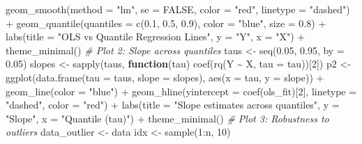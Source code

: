 \documentclass[fleqn,8pt]{latex/stylish_article} %
\newenvironment{Shaded}{\begin{snugshade}}{\end{snugshade}}
\newcommand{\DecValTok}[1]{\textcolor[rgb]{0.00,0.00,0.81}{{#1}}}
\newcommand{\FloatTok}[1]{\textcolor[rgb]{0.00,0.00,0.81}{{#1}}}
\newcommand{\ConstantTok}[1]{\textcolor[rgb]{0.00,0.00,0.00}{{#1}}}
\newcommand{\SpecialCharTok}[1]{\textcolor[rgb]{0.00,0.00,0.00}{{#1}}}
\newcommand{\StringTok}[1]{\textcolor[rgb]{0.31,0.60,0.02}{{#1}}}
\newcommand{\CommentTok}[1]{\textcolor[rgb]{0.56,0.35,0.01}{\textit{{#1}}}}
\newcommand{\OtherTok}[1]{\textcolor[rgb]{0.56,0.35,0.01}{{#1}}}
\newcommand{\FunctionTok}[1]{\textcolor[rgb]{0.00,0.00,0.00}{{#1}}}
\newcommand{\ControlFlowTok}[1]{\textcolor[rgb]{0.13,0.29,0.53}{\textbf{{#1}}}}
\newcommand{\AttributeTok}[1]{\textcolor[rgb]{0.77,0.63,0.00}{{#1}}}
\newcommand{\NormalTok}[1]{{#1}}
\begin{document}
\begin{Shaded}
\begin{Highlighting}[]
    \FunctionTok{geom\_smooth}\NormalTok{(}\AttributeTok{method =} \StringTok{"lm"}\NormalTok{, }\AttributeTok{se =} \ConstantTok{FALSE}\NormalTok{, }\AttributeTok{color =} \StringTok{"red"}\NormalTok{,}
        \AttributeTok{linetype =} \StringTok{"dashed"}\NormalTok{) }\SpecialCharTok{+} \FunctionTok{geom\_quantile}\NormalTok{(}\AttributeTok{quantiles =} \FunctionTok{c}\NormalTok{(}\FloatTok{0.1}\NormalTok{,}
    \FloatTok{0.5}\NormalTok{, }\FloatTok{0.9}\NormalTok{), }\AttributeTok{color =} \StringTok{"blue"}\NormalTok{, }\AttributeTok{size =} \FloatTok{0.8}\NormalTok{) }\SpecialCharTok{+} \FunctionTok{labs}\NormalTok{(}\AttributeTok{title =} \StringTok{"OLS vs Quantile Regression Lines"}\NormalTok{,}
    \AttributeTok{y =} \StringTok{"Y"}\NormalTok{, }\AttributeTok{x =} \StringTok{"X"}\NormalTok{) }\SpecialCharTok{+} \FunctionTok{theme\_minimal}\NormalTok{()}
\CommentTok{\# Plot 2: Slope across quantiles}
\NormalTok{taus }\OtherTok{\textless{}{-}} \FunctionTok{seq}\NormalTok{(}\FloatTok{0.05}\NormalTok{, }\FloatTok{0.95}\NormalTok{, }\AttributeTok{by =} \FloatTok{0.05}\NormalTok{)}
\NormalTok{slopes }\OtherTok{\textless{}{-}} \FunctionTok{sapply}\NormalTok{(taus, }\ControlFlowTok{function}\NormalTok{(tau) }\FunctionTok{coef}\NormalTok{(}\FunctionTok{rq}\NormalTok{(Y }\SpecialCharTok{\textasciitilde{}}\NormalTok{ X,}
    \AttributeTok{tau =}\NormalTok{ tau))[}\DecValTok{2}\NormalTok{])}
\NormalTok{p2 }\OtherTok{\textless{}{-}} \FunctionTok{ggplot}\NormalTok{(}\FunctionTok{data.frame}\NormalTok{(}\AttributeTok{tau =}\NormalTok{ taus, }\AttributeTok{slope =}\NormalTok{ slopes),}
    \FunctionTok{aes}\NormalTok{(}\AttributeTok{x =}\NormalTok{ tau, }\AttributeTok{y =}\NormalTok{ slope)) }\SpecialCharTok{+} \FunctionTok{geom\_line}\NormalTok{(}\AttributeTok{color =} \StringTok{"blue"}\NormalTok{) }\SpecialCharTok{+}
    \FunctionTok{geom\_hline}\NormalTok{(}\AttributeTok{yintercept =} \FunctionTok{coef}\NormalTok{(ols\_fit)[}\DecValTok{2}\NormalTok{], }\AttributeTok{linetype =} \StringTok{"dashed"}\NormalTok{,}
        \AttributeTok{color =} \StringTok{"red"}\NormalTok{) }\SpecialCharTok{+} \FunctionTok{labs}\NormalTok{(}\AttributeTok{title =} \StringTok{"Slope estimates across quantiles"}\NormalTok{,}
    \AttributeTok{y =} \StringTok{"Slope"}\NormalTok{, }\AttributeTok{x =} \StringTok{"Quantile (tau)"}\NormalTok{) }\SpecialCharTok{+} \FunctionTok{theme\_minimal}\NormalTok{()}
\CommentTok{\# Plot 3: Robustness to outliers}
\NormalTok{data\_outlier }\OtherTok{\textless{}{-}}\NormalTok{ data}
\NormalTok{idx }\OtherTok{\textless{}{-}} \FunctionTok{sample}\NormalTok{(}\DecValTok{1}\SpecialCharTok{:}\NormalTok{n, }\DecValTok{10}\NormalTok{)}

\end{Highlighting}
\end{Shaded}
\end{document}
